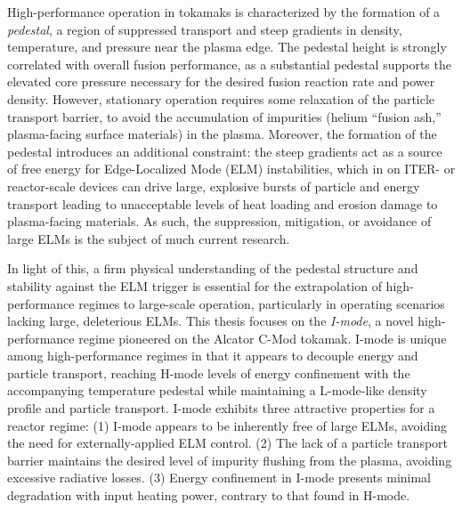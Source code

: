 High-performance operation in tokamaks is characterized by the formation of a \emph{pedestal}, a region of suppressed transport and steep gradients in density, temperature, and pressure near the plasma edge.  The pedestal height is strongly correlated with overall fusion performance, as a substantial pedestal supports the elevated core pressure necessary for the desired fusion reaction rate and power density.  However, stationary operation requires some relaxation of the particle transport barrier, to avoid the accumulation of impurities (\eg helium ``fusion ash,'' plasma-facing surface materials) in the plasma.  Moreover, the formation of the pedestal introduces an additional constraint: the steep gradients act as a source of free energy for Edge-Localized Mode (ELM) instabilities, which in on ITER- or reactor-scale devices can drive large, explosive bursts of particle and energy transport leading to unacceptable levels of heat loading and erosion damage to plasma-facing materials.  As such, the suppression, mitigation, or avoidance of large ELMs is the subject of much current research.
   
In light of this, a firm physical understanding of the pedestal structure and stability against the ELM trigger is essential for the extrapolation of high-performance regimes to large-scale operation, particularly in operating scenarios lacking large, deleterious ELMs.  This thesis focuses on the \emph{I-mode}, a novel high-performance regime pioneered on the Alcator C-Mod tokamak.  I-mode is unique among high-performance regimes in that it appears to decouple energy and particle transport, reaching H-mode levels of energy confinement with the accompanying temperature pedestal while maintaining a L-mode-like density profile and particle transport.  I-mode exhibits three attractive properties for a reactor regime: (1) I-mode appears to be inherently free of large ELMs, avoiding the need for externally-applied ELM control.  (2) The lack of a particle transport barrier maintains the desired level of impurity flushing from the plasma, avoiding excessive radiative losses.  (3) Energy confinement in I-mode presents minimal degradation with input heating power, contrary to that found in H-mode.
   
